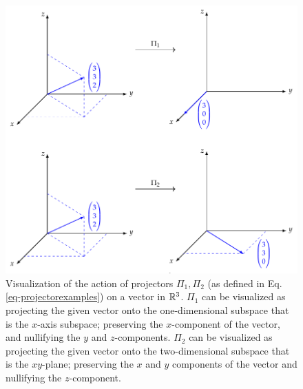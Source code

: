 \begin{figure}[htbp]
    \centering
    \includegraphics[]{Images/fig-projectorvisualization.pdf}
    \caption{Visualization of the action of projectors $\Pi_1, \Pi_2$ (as defined in Eq. \eqref{eq-projectorexamples}) on a vector in $\mathbb{R}^3$. $\Pi_1$ can be visualized as projecting the given vector onto the one-dimensional subspace that is the $x$-axis subspace; preserving the $x$-component of the vector, and nullifying the $y$ and $z$-components. $\Pi_2$ can be visualized as projecting the given vector onto the two-dimensional subspace that is the $xy$-plane; preserving the $x$ and $y$ components of the vector and nullifying the $z$-component.}
    \label{fig-projectorvisualization}
\end{figure}

